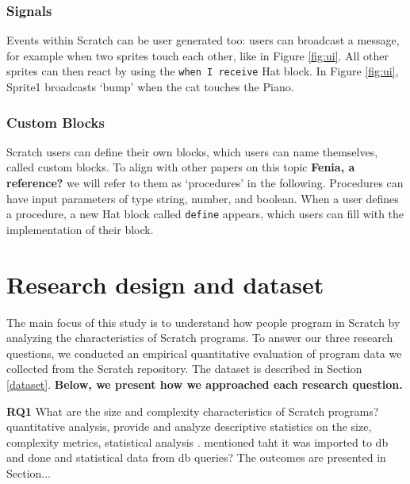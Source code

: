 \documentclass{sig-alternate}
\newcommand{\todo}[1]{\textbf{#1}}
\begin{document}
\subsubsection{Signals}
Events within Scratch can be user generated too: users can broadcast a message, for example when two sprites touch each other, like in Figure \ref{fig:ui}. All other sprites can then react by using the \texttt{when I receive} Hat block. In Figure \ref{fig:ui}, Sprite1 broadcasts `bump' when the cat touches the Piano. 

\subsubsection{Custom Blocks}
Scratch users can define their own blocks, which users can name themselves, called custom blocks. To align with other papers on this topic \todo{Fenia, a reference?} we will refer to them as `procedures' in the following. Procedures can have input parameters of type string, number, and boolean. When a user defines a procedure, a new Hat block called \texttt{define} appears, which users can fill with the implementation of their block.




\section{Research design and dataset}
\label{researchDesign}

The main focus of this study is to understand how people program in Scratch by analyzing the characteristics of Scratch programs. To answer our three research questions, we conducted an empirical quantitative evaluation of program data we collected from the Scratch repository. The dataset is described in Section \ref{dataset}. \todo{Below, we present how we approached each research question.}

\textbf{RQ1} What are the size and complexity characteristics of Scratch programs? quantitative analysis, provide and analyze descriptive statistics on the size, complexity metrics, statistical analysis . mentioned taht it was imported to db and done and statistical data from db queries? The outcomes are presented in Section...
\end{document}
